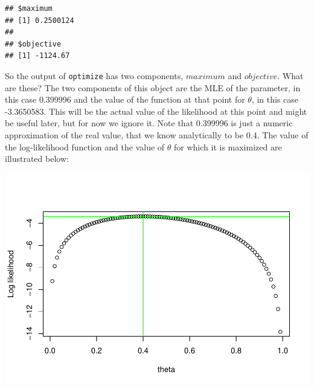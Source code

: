 \documentclass[
]{book}
\newenvironment{Shaded}{\begin{snugshade}}{\end{snugshade}}
\newcommand{\AttributeTok}[1]{\textcolor[rgb]{0.77,0.63,0.00}{#1}}
\newcommand{\CommentTok}[1]{\textcolor[rgb]{0.56,0.35,0.01}{\textit{#1}}}
\newcommand{\ControlFlowTok}[1]{\textcolor[rgb]{0.13,0.29,0.53}{\textbf{#1}}}
\newcommand{\DecValTok}[1]{\textcolor[rgb]{0.00,0.00,0.81}{#1}}
\newcommand{\FloatTok}[1]{\textcolor[rgb]{0.00,0.00,0.81}{#1}}
\newcommand{\FunctionTok}[1]{\textcolor[rgb]{0.00,0.00,0.00}{#1}}
\newcommand{\NormalTok}[1]{#1}
\newcommand{\OtherTok}[1]{\textcolor[rgb]{0.56,0.35,0.01}{#1}}
\newcommand{\SpecialCharTok}[1]{\textcolor[rgb]{0.00,0.00,0.00}{#1}}
\newcommand{\StringTok}[1]{\textcolor[rgb]{0.31,0.60,0.02}{#1}}
\begin{document}
\begin{verbatim}
## $maximum
## [1] 0.2500124
## 
## $objective
## [1] -1124.67
\end{verbatim}

So the output of \texttt{optimize} has two components, \(maximum\) and \(objective\). What are these?
The two components of this object are the MLE of the parameter, in this case 0.399996 and the value of the function at that point for \(\theta\), in this case -3.3650583. This will be the actual value of the likelihood at this point and might be useful later, but for now we ignore it. Note that 0.399996 is just a numeric approximation of the real value, that we know analytically to be 0.4. The value of the log-likelihood function and the value of \(\theta\) for which it is maximized are illustrated below:

\begin{Shaded}
\end{Shaded}

\includegraphics{ECOMODbook_files/figure-latex/ch13.16-1.pdf}
\end{document}
